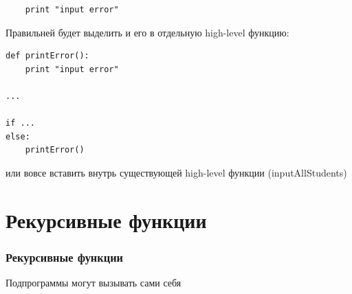 {\begin{frame}[fragile]
  \vspace{1cm}
  \begin{verbatim}
    print "input error"
  \end{verbatim}
\end{frame}

\begin{frame}[fragile]
  Правильней будет выделить и его в отдельную high-level функцию:

  \vspace{0.5cm}
  \begin{verbatim}
def printError():
    print "input error"

...

if ...
else:
    printError()
  \end{verbatim}

  \vspace{0.5cm}
  или вовсе вставить внутрь существующей high-level функции (inputAllStudents)
\end{frame}

\section{Рекурсивные функции}
\begin{frame}[fragile]
  \frametitle{Рекурсивные функции}

  Подпрограммы могут вызывать сами себя
\end{frame}


}
